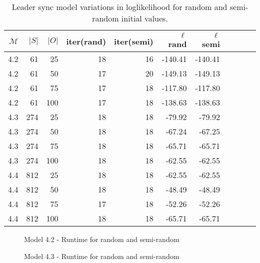 \begin{table}
    \centering
    \caption{Leader sync model variations in loglikelihood for random and semi-random initial values.}
    \label{tab:leader_results_loglikelihood}
    \begin{tabular}{rrrrrrrrrrr}
        \toprule
        $\mathcal{M}$ & $|S|$ & $|O|$ & iter(rand) & iter(semi) & $\ell$ rand & $\ell$ semi \\
        \midrule
        4.2           & 61    & 25    & 18         & 16         & -140.41     & -140.41     \\
        4.2           & 61    & 50    & 17         & 20         & -149.13     & -149.13     \\
        4.2           & 61    & 75    & 17         & 18         & -117.80     & -117.80     \\
        4.2           & 61    & 100   & 17         & 18         & -138.63     & -138.63     \\
        4.3           & 274   & 25    & 18         & 18         & -79.92      & -79.92      \\
        4.3           & 274   & 50    & 18         & 18         & -67.24      & -67.25      \\
        4.3           & 274   & 75    & 18         & 18         & -65.71      & -65.71      \\
        4.3           & 274   & 100   & 18         & 18         & -62.55      & -62.55      \\
        4.4           & 812   & 25    & 18         & 18         & -62.55      & -62.55      \\
        4.4           & 812   & 50    & 18         & 18         & -48.49      & -48.49      \\
        4.4           & 812   & 75    & 17         & 18         & -52.26      & -52.26      \\
        4.4           & 812   & 100   & 18         & 18         & -65.71      & -65.71      \\
        \bottomrule
    \end{tabular}
\end{table}


\begin{figure}
    
    \caption{Model 4.2 - Runtime for random and semi-random}
    \label{fig:semirandom-cupaal-jajapy-4-2}
\end{figure}

\begin{figure}
    
    \caption{Model 4.3 - Runtime for random and semi-random}
    \label{fig:semirandom-cupaal-jajapy-4-3}
\end{figure}


